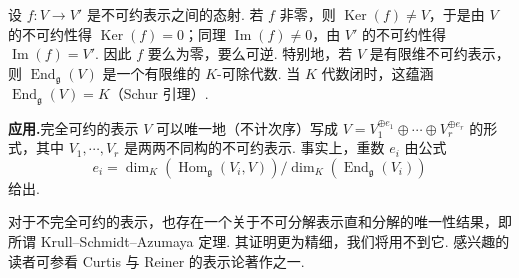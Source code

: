 \begin{lemma}[Schur]\label{lemma:ssl-2-1-7}
设 $f : V \longrightarrow V'$ 是不可约表示之间的态射. 若 $f$ 非零，则 $\operatorname{Ker}(f) \neq V$，于是由 $V$ 的不可约性得 $\operatorname{Ker}(f) = 0$；同理 $\operatorname{Im}(f) \neq 0$，由 $V'$ 的不可约性得 $\operatorname{Im}(f) = V'$. 因此 $f$ 要么为零，要么可逆.
特别地，若 $V$ 是有限维不可约表示，则 $\operatorname{End}_{\mathfrak{g}}(V)$ 是一个有限维的 $K$-可除代数. 当 $K$ 代数闭时，这蕴涵 $\operatorname{End}_{\mathfrak{g}}(V) = K$（Schur 引理）.
\end{lemma}
\textbf{应用.}\quad 完全可约的表示 $V$ 可以唯一地（不计次序）写成 $V = V_1^{\oplus e_1} \oplus \cdots \oplus V_r^{\oplus e_r}$ 的形式，其中 $V_1, \cdots, V_r$ 是两两不同构的不可约表示. 事实上，重数 $e_i$ 由公式
\[e_i = \dim_K(\operatorname{Hom}_{\mathfrak{g}}(V_i, V)) / \dim_K(\operatorname{End}_{\mathfrak{g}}(V_i))\]
给出.
\begin{remark*}
对于不完全可约的表示，也存在一个关于不可分解表示直和分解的唯一性结果，即所谓 Krull--Schmidt--Azumaya 定理. 其证明更为精细，我们将用不到它. 感兴趣的读者可参看 Curtis 与 Reiner 的表示论著作之一.
\end{remark*}

